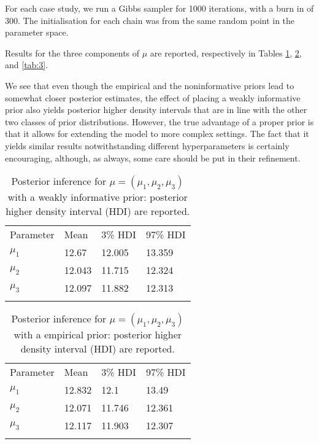 \documentclass[graybox]{svmult}
\begin{document}
For each case study, we run a Gibbs sampler for 1000 iterations, with
a burn in of 300. The initialisation for each chain was from the same
random point in the parameter space.

Results for the three components of $\mu$ are reported, respectively
in Tables \ref{tab:1}, \ref{tab:2}, and \ref{tab:3}.

We see that even though the empirical and the noninformative priors
lead to somewhat closer posterior estimates, the effect of placing a
weakly informative prior also yields posterior higher density
intervals that are in line with the other two classes of prior
distributions. However, the true advantage of a proper prior is that
it allows for extending the model to more complex settings. The fact
that it yields similar results notwithstanding different
hyperparameters is certainly encouraging, although, as always, some
care should be put in their refinement.

\begin{table}
\caption{Posterior inference for $\mu = \left( \mu_{1}, \mu_{2}, \mu_{3} \right)$ with a weakly informative prior: posterior higher density interval (HDI) are reported.}
\label{tab:1}       %
%
%
\begin{tabular}{p{2cm}p{2.4cm}p{2cm}p{4.9cm}}
\hline\noalign{\smallskip}
Parameter & Mean & 3\% HDI & 97\% HDI \\
\noalign{\smallskip}\svhline\noalign{\smallskip}
$\mu_{1}$ & 12.67  & 12.005 & 13.359 \\
$\mu_2$ & 12.043 & 11.715 & 12.324\\
$\mu_3$ & 12.097  & 11.882 & 12.313 \\
\noalign{\smallskip}\hline\noalign{\smallskip}
\end{tabular}
\end{table}

\begin{table}
\caption{Posterior inference for $\mu = \left( \mu_{1}, \mu_{2}, \mu_{3}\right)$ with a empirical prior: posterior higher density interval (HDI) are reported.}
\label{tab:2}       %
%
%
\begin{tabular}{p{2cm}p{2.4cm}p{2cm}p{4.9cm}}
\hline\noalign{\smallskip}
Parameter & Mean & 3\% HDI & 97\% HDI \\
\noalign{\smallskip}\svhline\noalign{\smallskip}
$\mu_{1}$ & 12.832  & 12.1 & 13.49 \\
$\mu_2$ & 12.071 & 11.746 & 12.361\\
$\mu_3$ & 12.117  & 11.903 & 12.307 \\
\noalign{\smallskip}\hline\noalign{\smallskip}
\end{tabular}
\end{table}
\end{document}
